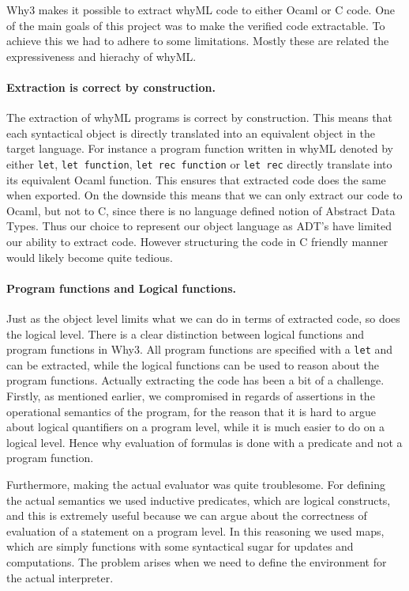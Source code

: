Why3 makes it possible to extract whyML code to either Ocaml or C code.
One of the main goals of this project was to make the verified code extractable.
To achieve this we had to adhere to some limitations.
Mostly these are related the expressiveness and hierachy of whyML.

\paragraph{Extraction is correct by construction.}
The extraction of whyML programs is correct by construction.
This means that each syntactical object is directly translated into an equivalent object
in the target language. For instance a program function written in whyML denoted by either \texttt{let}, \texttt{let function}, \texttt{let rec function} or \texttt{let rec} directly translate into its equivalent Ocaml function. This ensures that extracted code does the same when exported.
On the downside this means that we can only extract our code to Ocaml, but not to C, since there is no
language defined notion of Abstract Data Types.
Thus our choice to represent our object language as ADT's have limited our ability to extract code.
However structuring the code in C friendly manner would likely become quite tedious.

\paragraph{Program functions and Logical functions.}
Just as the object level limits what we can do in terms of extracted code, so does the logical level.
There is a clear distinction between logical functions and program functions in Why3.
All program functions are specified with a \texttt{let} and can be extracted,
while the logical functions can be used to reason about the program functions.
Actually extracting the code has been a bit of a challenge.
Firstly, as mentioned earlier, we compromised in regards of assertions in the operational semantics of the program,
for the reason that it is hard to argue about logical quantifiers on a program level,
while it is much easier to do on a logical level.
Hence why evaluation of formulas is done with a predicate and not a program function.

Furthermore, making the actual evaluator was quite troublesome.
For defining the actual semantics we used inductive predicates, which are logical constructs, and this is extremely useful because we can argue about the correctness of evaluation of a statement on a program level.
In this reasoning we used maps, which are simply functions with some syntactical sugar for updates and computations.
The problem arises when we need to define the environment for the actual interpreter.

